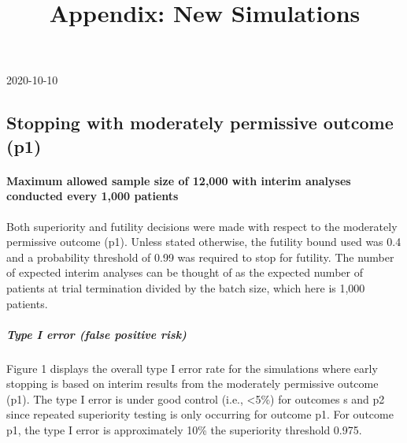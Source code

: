 \documentclass[]{article}
\title{Appendix: New Simulations}
\author{}
\date{\vspace{-2.5em}}
\let\oldparagraph\paragraph
\renewcommand{\paragraph}[1]{\oldparagraph{#1}\mbox{}}
\let\oldsubparagraph\subparagraph
\renewcommand{\subparagraph}[1]{\oldsubparagraph{#1}\mbox{}}
\begin{document}
\maketitle

2020-10-10

\hypertarget{stopping-with-moderately-permissive-outcome-p1}{%
\subsection{Stopping with moderately permissive outcome
(p1)}\label{stopping-with-moderately-permissive-outcome-p1}}

\hypertarget{maximum-allowed-sample-size-of-12000-with-interim-analyses-conducted-every-1000-patients}{%
\paragraph{Maximum allowed sample size of 12,000 with interim analyses
conducted every 1,000
patients}\label{maximum-allowed-sample-size-of-12000-with-interim-analyses-conducted-every-1000-patients}}

Both superiority and futility decisions were made with respect to the
moderately permissive outcome (p1). Unless stated otherwise, the
futility bound used was 0.4 and a probability threshold of 0.99 was
required to stop for futility. The number of expected interim analyses
can be thought of as the expected number of patients at trial
termination divided by the batch size, which here is 1,000 patients.

\hypertarget{type-i-error-false-positive-risk}{%
\subparagraph{Type I error (false positive
risk)}\label{type-i-error-false-positive-risk}}

Figure 1 displays the overall type I error rate for the simulations
where early stopping is based on interim results from the moderately
permissive outcome (p1). The type I error is under good control (i.e.,
\textless{}5\%) for outcomes s and p2 since repeated superiority testing
is only occurring for outcome p1. For outcome p1, the type I error is
approximately 10\% the superiority threshold 0.975.

\captionsetup[figure]{font=small,labelfont=small}
\end{document}
